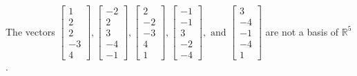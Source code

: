\begin{exercise}
\begin{exerciseStatement}
  \end{exerciseStatement}
  \begin{exerciseAnswer}
   The vectors \(\left[\begin{array}{r}
1 \\
2 \\
2 \\
-3 \\
4
\end{array}\right] , \left[\begin{array}{r}
-2 \\
2 \\
3 \\
-4 \\
-1
\end{array}\right] , \left[\begin{array}{r}
2 \\
-2 \\
-3 \\
4 \\
1
\end{array}\right] , \left[\begin{array}{r}
-1 \\
-1 \\
3 \\
-2 \\
-4
\end{array}\right] , \text{ and } \left[\begin{array}{r}
3 \\
-4 \\
-1 \\
-4 \\
1
\end{array}\right]\) 
  	 are not  a basis of \(\mathbb{R}^5\).
  


  \end{exerciseAnswer}
\end{exercise}